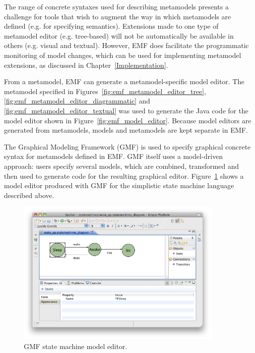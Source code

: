 The range of concrete syntaxes used for describing metamodels presents a challenge for tools that wish to augment the way in which metamodels are defined (e.g. for specifying semantics). Extensions made to one type of metamodel editor (e.g. tree-based) will not be automatically be available in others (e.g. visual and textual). However, EMF does facilitate the programmatic monitoring of model changes, which can be used for implementing metamodel extensions, as discussed in Chapter~\ref{Implementation}. 

From a metamodel, EMF can generate a metamodel-specific model editor. The metamodel specified in Figures~\ref{fig:emf_metamodel_editor_tree}, \ref{fig:emf_metamodel_editor_diagrammatic} and \ref{fig:emf_metamodel_editor_textual} was used to generate the Java code for the model editor shown in Figure~\ref{fig:emf_model_editor}. Because model editors are generated from metamodels, models and metamodels are kept separate in EMF.

The Graphical Modeling Framework (GMF) \cite{gronback09emp} is used to specify graphical concrete syntax for metamodels defined in EMF. GMF itself uses a model-driven approach: users specify several models, which are combined, transformed and then used to generate code for the resulting graphical editor. Figure~\ref{fig:gmf_model_editor} shows a model editor produced with GMF for the simplistic state machine language described above.

\begin{figure}[htbp]
  \begin{center}
    \leavevmode
    \includegraphics[width=10cm]{2.Background/images/gmf_model_editor.png}
  \end{center}
  \caption{GMF state machine model editor.}
  \label{fig:gmf_model_editor}
\end{figure}

